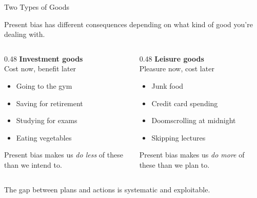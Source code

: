 \documentclass[10pt]{beamer}
\begin{document}
\begin{frame}{Two Types of Goods}

Present bias has different consequences depending on what kind of good you're dealing with.


\begin{columns}[T]
\begin{column}{0.48\textwidth}
\textbf{\color{myTeal} Investment goods}\\[4pt]
Cost now, benefit later
\begin{itemize}
\item Going to the gym
\item Saving for retirement
\item Studying for exams
\item Eating vegetables
\end{itemize}

\footnotesize Present bias makes us \emph{do less} of these than we intend to.
\end{column}
\begin{column}{0.48\textwidth}
\textbf{\color{myOrange} Leisure goods}\\[4pt]
Pleasure now, cost later
\begin{itemize}
\item Junk food
\item Credit card spending
\item Doomscrolling at midnight
\item Skipping lectures
\end{itemize}

\footnotesize Present bias makes us \emph{do more} of these than we plan to.
\end{column}
\end{columns}


\alert{The gap between plans and actions is systematic and exploitable.}
\end{frame}
\end{document}
